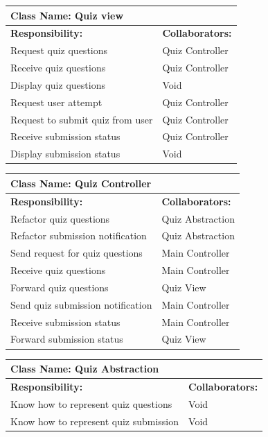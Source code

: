 \documentclass[]{article}
\begin{document}
	\begin{table}[H]
	\centering
		\begin{tabular}{|p{9cm}|p{3cm}|}
		\hline
		 \multicolumn{2}{|l|}{\textbf{Class Name: Quiz view}} \\
		\hline
		\textbf{Responsibility:} & \textbf{Collaborators:} \\
		\hline
		Request quiz questions & Quiz Controller\\
		\hline
	    Receive quiz questions & Quiz Controller\\
	    \hline
	    Display quiz questions & Void\\
	    \hline 
	    Request user attempt & Quiz Controller\\
	    \hline
	    Request to submit quiz from user& Quiz Controller\\
	    \hline
	    Receive submission status & Quiz Controller\\
	    \hline
	    Display submission status & Void\\
	    \hline
		\end{tabular}
	\end{table}
	
	\begin{table}[H]
	\centering
		\begin{tabular}{|p{9cm}|p{3cm}|}
		\hline
		 \multicolumn{2}{|l|}{\textbf{Class Name: Quiz Controller}} \\
		\hline
		\textbf{Responsibility:} & \textbf{Collaborators:} \\
		\hline
	    Refactor quiz questions & Quiz Abstraction\\
		\hline
		Refactor submission notification & Quiz Abstraction\\
		\hline
	    Send request for quiz questions & Main Controller\\
		\hline
		Receive quiz questions & Main Controller\\
		\hline
		Forward quiz questions & Quiz View\\
		\hline
		Send quiz submission notification & Main Controller\\
		\hline
		Receive submission status & Main Controller\\
		\hline
		Forward submission status & Quiz View\\
		\hline
		\end{tabular}
	\end{table}
	
	\begin{table}[H]
	\centering
		\begin{tabular}{|p{9cm}|p{3cm}|}
		\hline
		 \multicolumn{2}{|l|}{\textbf{Class Name: Quiz Abstraction}} \\
		\hline
		\textbf{Responsibility:} & \textbf{Collaborators:} \\
		\hline
	    Know how to represent quiz questions  & Void\\
		\hline
		Know how to represent quiz submission & Void\\
		\hline
		\end{tabular}
	\end{table}
\end{document}
